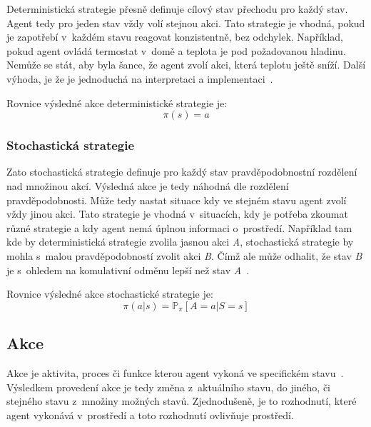   Deterministická strategie přesně definuje cílový stav přechodu pro každý stav.
  Agent tedy pro jeden stav vždy volí stejnou akci.
  Tato strategie je vhodná, pokud je zapotřebí v~každém stavu reagovat konzistentně, bez odchylek.
  Například, pokud agent ovládá termostat v~domě a teplota je pod požadovanou hladinu.
  Nemůže se stát, aby byla šance, že agent zvolí akci, která teplotu ještě sníží.
  Další výhoda, je že je jednoduchá na interpretaci a implementaci~\cite{Policies}.

  Rovnice výsledné akce deterministické strategie je:
  \begin{equation}
    \pi(s) = a\label{eq:policy_deterministic}
  \end{equation}

  \subsubsection*{Stochastická strategie}
  
  Zato stochastická strategie definuje pro každý stav pravděpodobnostní rozdělení nad množinou akcí.
  Výsledná akce je tedy náhodná dle rozdělení pravděpodobnosti.
  Může tedy nastat situace kdy ve stejném stavu agent zvolí vždy jinou akci.
  Tato strategie je vhodná v~situacích, kdy je potřeba zkoumat různé strategie a kdy agent nemá úplnou informaci o~prostředí.
  Například tam kde by deterministická strategie zvolila jasnou akci \textit{A}, stochastická strategie by mohla s~malou pravděpodobností zvolit akci \textit{B}.
  Čímž ale může odhalit, že stav \textit{B} je s~ohledem na komulativní odměnu lepší než stav \textit{A}~\cite{Policies}.

  Rovnice výsledné akce stochastické strategie je:
  \begin{equation}
    \pi(a \vert s) = \mathbb{P}_\pi [A=a \vert S=s]\label{eq:policy_stochastic}
  \end{equation}

\subsection{Akce}\label{subsec:akce}

Akce je aktivita, proces či funkce kterou agent vykoná ve specifickém stavu~\cite{ActionCo67}.
Výsledkem provedení akce je tedy změna z~aktuálního stavu, do jiného, či stejného stavu z~množiny možných stavů.
Zjednodušeně, je to rozhodnutí, které agent vykonává v~prostředí a toto rozhodnutí ovlivňuje prostředí.


